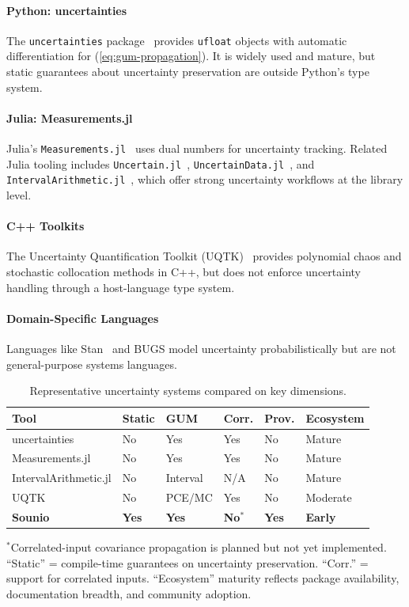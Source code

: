 \documentclass[journal]{IEEEtran}
\begin{document}
\paragraph{Python: uncertainties}
The \texttt{uncertainties} package~\cite{lebigot2024uncertainties}
provides \texttt{ufloat} objects with automatic differentiation for
(\ref{eq:gum-propagation}). It is widely used and mature, but static
guarantees about uncertainty preservation are outside Python's type system.

\paragraph{Julia: Measurements.jl}
Julia's \texttt{Measurements.jl}~\cite{giordano2016measurements} uses
dual numbers for uncertainty tracking. Related Julia tooling includes
\texttt{Uncertain.jl}~\cite{uncertainjl},
\texttt{UncertainData.jl}~\cite{uncertaindatajl}, and
\texttt{IntervalArithmetic.jl}~\cite{intervalarithmeticjl}, which offer
strong uncertainty workflows at the library level.

\paragraph{C++ Toolkits}
The Uncertainty Quantification Toolkit (UQTK)~\cite{uqtk} provides
polynomial chaos and stochastic collocation methods in C++, but does not
enforce uncertainty handling through a host-language type system.

\paragraph{Domain-Specific Languages}
Languages like Stan~\cite{carpenter2017stan} and BUGS model uncertainty
probabilistically but are not general-purpose systems languages.

\begin{table}[!t]
\caption{Representative uncertainty systems compared on key dimensions.}
\label{tab:approaches}
\centering
\footnotesize
\begin{tabular}{llllll}
\toprule
Tool & Static & GUM & Corr. & Prov. & Ecosystem \\
\midrule
uncertainties & No & Yes & Yes & No & Mature \\
Measurements.jl & No & Yes & Yes & No & Mature \\
IntervalArithmetic.jl & No & Interval & N/A & No & Mature \\
UQTK & No & PCE/MC & Yes & No & Moderate \\
\textbf{Sounio} & \textbf{Yes} & \textbf{Yes} & \textbf{No}$^{*}$ & \textbf{Yes} & \textbf{Early} \\
\bottomrule
\end{tabular}

\smallskip
\raggedright
\footnotesize
$^{*}$Correlated-input covariance propagation is planned but not yet
implemented. ``Static'' = compile-time guarantees on uncertainty preservation.
``Corr.'' = support for correlated inputs. ``Ecosystem'' maturity reflects
package availability, documentation breadth, and community adoption.
\end{table}
\end{document}
